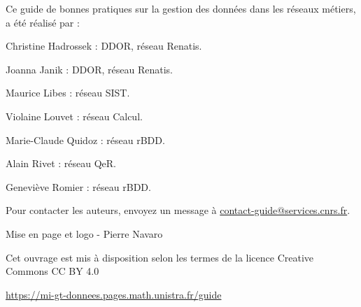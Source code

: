 \vspace*{\fill}
\begingroup

Ce guide de bonnes pratiques sur la gestion des données dans les réseaux métiers, a été réalisé par  :

\begin{list}{-}{}
\item Christine Hadrossek : DDOR, réseau Renatis.
\item Joanna Janik : DDOR, réseau Renatis.
\item Maurice Libes : réseau SIST.
\item Violaine Louvet : réseau Calcul.
\item Marie-Claude Quidoz : réseau rBDD.
\item Alain Rivet : réseau QeR.
\item Geneviève Romier : réseau rBDD.
\end{list}

Pour contacter les auteurs, envoyez un message à \href{mailto:contact-guide@services.cnrs.fr}{contact-guide@services.cnrs.fr}.

Mise en page et logo - Pierre Navaro

Cet ouvrage est mis à disposition selon les termes de la licence Creative Commons CC BY 4.0 \ccby

\url{https://mi-gt-donnees.pages.math.unistra.fr/guide}

\endgroup

\vspace*{\fill}
\clearpage
